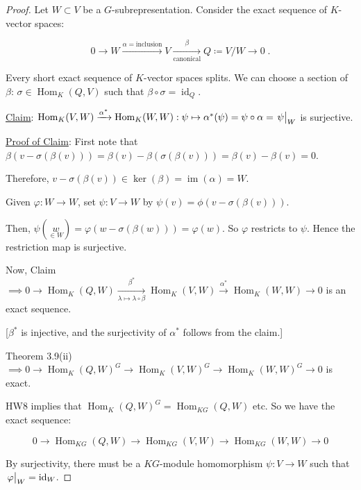 \documentclass{article}
\theoremstyle{definition}
\theoremstyle{plain}
\theoremstyle{remark}
\begin{document}
    \begin{proof}
        Let \(W \subset V\) be a \(G\)-subrepresentation. Consider the exact sequence of \(K\)-vector spaces:

        \[
            0 \to W \xrightarrow{\alpha=\text{inclusion}} V \xrightarrow[\text{canonical}]{\beta} Q \coloneqq V / W \to 0\;.
        \]

        Every short exact sequence of \(K\)-vector spaces splits. We can choose a section of \(\beta\): \(\sigma \in \operatorname{Hom}_K(Q, V)\) such that \(\beta \circ \sigma = \operatorname{id}_{Q}\).

        \underline{Claim}: \(\operatorname{Hom}_K(V,W) \xrightarrow{\alpha^{\ast}} \operatorname{Hom}_K(W,W) : \psi \mapsto \alpha^{\ast}(\psi) = \psi \circ \alpha = \eval{\psi}_{W}\) is surjective.

        \underline{Proof of Claim}: First note that \(\beta(v - \sigma(\beta(v))) = \beta(v) - \beta(\sigma(\beta(v))) = \beta(v) - \beta(v) = 0\).
        
        Therefore, \(v - \sigma(\beta(v)) \in \ker(\beta) = \operatorname{im}(\alpha) = W\).

        Given \(\varphi: W \to W\), set \(\psi : V \to W\) by \(\psi(v) = \phi(v - \sigma(\beta(v)))\).

        Then, \(\psi(\underset{\in W}{w}) = \varphi(w - \sigma(\beta(w))) = \varphi(w)\). So \(\varphi\) restricts to \(\psi\). Hence the restriction map is surjective.
        
        Now, Claim \(\implies 0 \to \operatorname{Hom}_K(Q,W) \xrightarrow[\lambda \mapsto \lambda \circ \beta]{\beta^{\ast}} \operatorname{Hom}_K(V,W) \xrightarrow{\alpha^{\ast}} \operatorname{Hom}_K(W,W) \to 0\) is an exact sequence.

        [\(\beta^{\ast}\) is injective, and the surjectivity of \(\alpha^{\ast}\) follows from the claim.]

        Theorem 3.9(ii) \(\implies 0 \to \operatorname{Hom}_K(Q,W)^G \to \operatorname{Hom}_K(V,W)^G \to \operatorname{Hom}_K(W,W)^G \to 0\) is exact.

        HW8 implies that \(\operatorname{Hom}_K(Q,W)^G = \operatorname{Hom}_{KG}(Q,W)\) etc. So we have the exact sequence:

        \[
            0 \to \operatorname{Hom}_{KG}(Q,W) \to \operatorname{Hom}_{KG}(V,W) \to \operatorname{Hom}_{KG}(W,W) \to 0
        \]

        By surjectivity, there must be a \(KG\)-module homomorphism \(\psi : V \to W\) such that \(\eval{\varphi}_{W} = \operatorname{id}_{W}\).


\end{proof}
\end{document}
